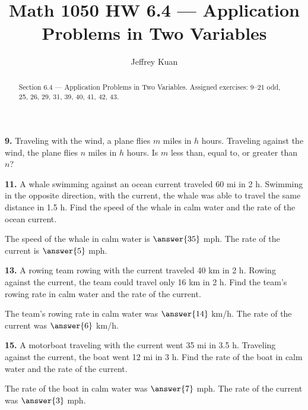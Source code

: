 \documentclass{ximera}
\author{Jeffrey Kuan}
\title{Math 1050 HW 6.4 --- Application Problems in Two Variables}
\begin{document}
\begin{abstract}
    Section 6.4 --- Application Problems in Two Variables.
    Assigned exercises: 9–21 odd, 25, 26, 29, 31, 39, 40, 41, 42, 43.
\end{abstract}

\maketitle

\begin{problem}
\textbf{9.} Traveling with the wind, a plane flies $m$ miles in $h$ hours. Traveling against
  the wind, the plane flies $n$ miles in $h$ hours. Is $m$ less than, equal to, or
  greater than $n$?

\begin{multipleChoice} 
\end{multipleChoice}
\end{problem}

\begin{problem}
\textbf{11.} A whale swimming against an ocean current traveled 60 mi in 2 h. Swimming in the
  opposite direction, with the current, the whale was able to travel the same distance in
  1.5 h. Find the speed of the whale in calm water and the rate of the ocean current.

The speed of the whale in calm water is $\answer{35}$ mph. The rate of the current is $\answer{5}$ mph.
\end{problem}

\begin{problem}
\textbf{13.} A rowing team rowing with the current traveled 40 km in 2 h. Rowing against the
  current, the team could travel only 16 km in 2 h. Find the team's rowing rate in calm
  water and the rate of the current.

The team's rowing rate in calm water was $\answer{14}$ km/h. The rate of the current was $\answer{6}$ km/h.
\end{problem}

\begin{problem}
\textbf{15.} A motorboat traveling with the current went 35 mi in 3.5 h. Traveling against the
  current, the boat went 12 mi in 3 h. Find the rate of the boat in calm water and the
  rate of the current.

The rate of the boat in calm water was $\answer{7}$ mph. The rate of the current was $\answer{3}$ mph.
\end{problem}
\end{document}
